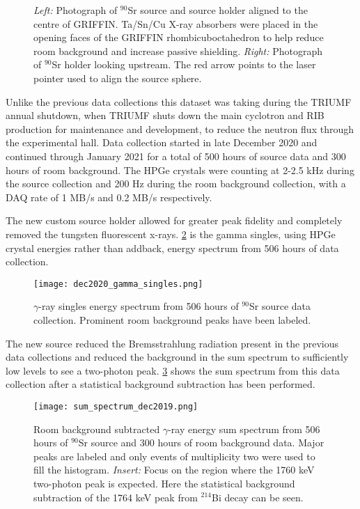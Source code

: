 \documentclass[cnatzke_thesis_proposal.tex]{subfiles}
\begin{document}
\begin{figure}[htbp]
  \centering
  \quad
  \caption{
    \textit{Left:} Photograph of $^{90}$Sr source and source holder aligned to the centre of GRIFFIN. Ta/Sn/Cu X-ray absorbers were placed in the opening faces of the GRIFFIN rhombicuboctahedron to help reduce room background and increase passive shielding.
    \textit{Right:} Photograph of $^{90}$Sr holder looking upstream. The red arrow points to the laser pointer used to align the source sphere.
  }
  \label{fig:source_holder_in_griffin}
\end{figure}

Unlike the previous data collections this dataset was taking during the TRIUMF annual shutdown, when TRIUMF shuts down the main cyclotron and RIB production for maintenance and development, to reduce the neutron flux through the experimental hall. Data collection started in late December 2020 and continued through January 2021 for a total of 500 hours of source data and 300 hours of room background. The HPGe crystals were counting at 2-2.5 kHz during the source collection and 200 Hz during the room background collection, with a DAQ rate of 1 MB/s and 0.2 MB/s respectively.

The new custom source holder allowed for greater peak fidelity and completely removed the tungsten fluorescent x-rays.
\ref{fig:dec2020_gamma_singles} is the gamma singles, using HPGe crystal energies rather than addback, energy spectrum from 506 hours of data collection.

\begin{figure}[htbp]
  \centering
  \texttt{[image: dec2020\_gamma\_singles.png]}
  \caption{$\gamma$-ray singles energy spectrum from 506 hours of $^{90}$Sr source data collection. Prominent room background peaks have been labeled.}
  \label{fig:dec2020_gamma_singles}
\end{figure}

The new source reduced the Bremsstrahlung radiation present in the previous data collections and reduced the background in the sum spectrum to sufficiently low levels to see a two-photon peak.
\ref{fig:sum_spectrum_dec2019} shows the sum spectrum from this data collection after a statistical background subtraction has been performed.

\begin{figure}[htbp]
  \centering
  \texttt{[image: sum\_spectrum\_dec2019.png]}
  \caption{Room background subtracted $\gamma$-ray energy sum spectrum from 506 hours of $^{90}$Sr source and 300 hours of room background data. Major peaks are labeled and only events of multiplicity two were used to fill the histogram. \textit{Insert:} Focus on the region where the 1760 keV two-photon peak is expected. Here the statistical background subtraction of the 1764 keV peak from $^{214}$Bi decay can be seen.}
  \label{fig:sum_spectrum_dec2019}
\end{figure}
\end{document}
